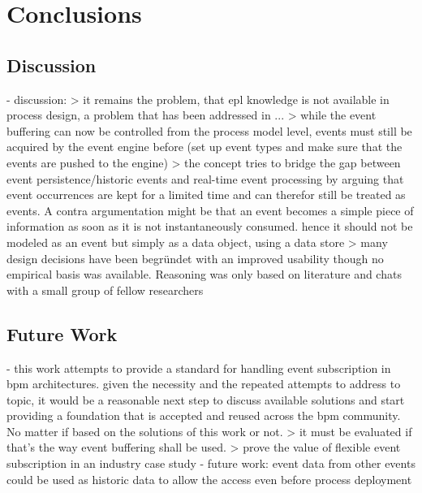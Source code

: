 \chapter{Conclusions}\label{ch:conclusion}



\section{Discussion}

- discussion:
> it remains the problem, that epl knowledge is not available in process design, a problem that has been addressed in ...
> while the event buffering can now be controlled from the process model level, events must still be acquired by the event engine before (set up event types and make sure that the events are pushed to the engine)
> the concept tries to bridge the gap between event persistence/historic events and real-time event processing by arguing that event occurrences are kept for a limited time and can therefor still be treated as events. A contra argumentation might be that an event becomes a simple piece of information as soon as it is not instantaneously consumed. hence it should not be modeled as an event but simply as a data object, using a data store
> many design decisions have been begründet with an improved usability though no empirical basis was available. Reasoning was only based on literature and chats with a small group of fellow researchers

\section{Future Work}


- this work attempts to provide a standard for handling event subscription in bpm architectures. given the necessity and the repeated attempts to address to topic, it would be a reasonable next step to discuss available solutions and start providing a foundation that is accepted and reused across the bpm community. No matter if based on the solutions of this work or not.
> it must be evaluated if that's the way event buffering shall be used. > prove the value of flexible event subscription in an industry case study
- future work: event data from other events could be used as historic data to allow the access even before process deployment
